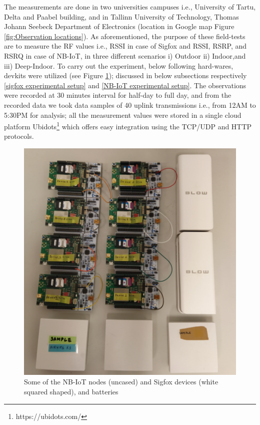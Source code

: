 \documentclass[12pt]{article}
\begin{document}
The measurements are done in two universities campuses i.e., University of Tartu, Delta and Paabel building, and in Tallinn University of Technology, Thomas Johann Seebeck Department of Electronics (location in Google map Figure \ref{fig:Observation locations}). As aforementioned, the purpose of these field-tests are to measure the RF values i.e., RSSI in case of Sigfox and RSSI, RSRP, and RSRQ in case of NB-IoT, in three different scenarios i) Outdoor ii) Indoor,and iii) Deep-Indoor. To carry out the experiment, below following hard-wares, devkits were utilized (see Figure \ref{fig:Experimental Setup}); discussed in below subsections respectively \ref{sigfox experimental setup} and \ref{NB-IoT experimental setup}. The observations were recorded at 30 minutes interval for half-day to full day, and from the recorded data we took data samples of 40 uplink transmissions i.e., from 12AM to 5:30PM for analysis; all the measurement values were stored in a single cloud platform Ubidots\footnote{https://ubidots.com/} which offers easy integration using the TCP/UDP and HTTP protocols.


\begin{figure}[H]
    \centering
    \includegraphics[trim=1cm 0cm 2cm 1cm,clip=true,width=0.9\columnwidth,totalheight=7.5cm ,width=0.9\columnwidth,keepaspectratio]{Images/experimentSetup.pdf}
    \caption{Some of the  NB-IoT nodes (uncased) and Sigfox devices (white squared shaped), and batteries}
    \label{fig:Experimental Setup}
\end{figure}
\end{document}
